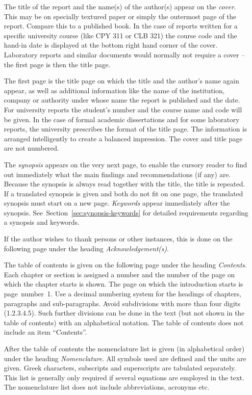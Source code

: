 \documentclass[a5paper, 10pt]{article}
\newcommand{\subsectionname}[1]{\emph{#1}}
\begin{document}
The title of the report and the name(s) of the author(s) appear on the
\emph{cover}. This may be on specially textured paper or simply the
outermost page of the report.  Compare this to a published book.  In
the case of reports written for a specific university course (like CPY
311 or CLB 321) the course code and the hand-in date is displayed at
the bottom right hand corner of the cover.  Laboratory reports and
similar documents would normally not require a cover -- the first page
is then the title page.

The first page is the title page on which the title and the author's
name again appear, as well as additional information like the name of
the institution, company or authority under whose name the report is
published and the date.  For university reports the student's number
and the course name and code will be given.  In the case of formal
academic dissertations and for some laboratory reports, the university
prescribes the format of the title page.  The information is arranged
intelligently to create a balanced impression.  The cover and title
page are not numbered.

The \subsectionname{synopsis} appears on the very next page, to enable
the cursory reader to find out immediately what the main findings and
recommendations (if any) are.  Because the synopsis is always read
together with the title, the title is repeated.  If a translated
synopsis is given and both do not fit on one page, the translated
synopsis must start on a new page.
\subsectionname{Keywords} appear immediately after
the synopsis.  See~Section~\ref{sec:synopsis-keywords} for detailed
requirements regarding a synopsis and keywords.

If the author wishes to thank persons or other instances, this is done
on the following page under the
heading \subsectionname{Acknowledgement(s)}.

The table of contents is given on the following page under the heading
\subsectionname{Contents}.  Each chapter or section is assigned a number and the number
of the page on which the chapter starts is shown.  The page on which
the introduction starts is page~number~1.  Use a decimal numbering
system for the headings of chapters, paragraphs and sub-paragraphs.
Avoid subdivisions with more than four digits (1.2.3.4.5).  Such
further divisions can be done in the text (but not shown in the table
of contents) with an alphabetical notation. The table of contents does
not include an item ``Contents''.

After the table of contents the nomenclature list is given (in
alphabetical order) under the heading \subsectionname{Nomenclature}.  All
symbols used are defined and the units are given.  Greek
characters, subscripts and superscripts are tabulated separately.
This list is generally only required if several equations are employed
in the text.  The nomenclature list does not include abbreviations,
acronyms etc.
\end{document}
